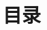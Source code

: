 \documentclass[11pt]{beamer}
\begin{document}
\begin{frame}[plain]\transboxout
  \titlepage
\end{frame}

\section*{目录}
\begin{frame}\ft{\secname}
    \tableofcontents
\end{frame}


 
\end{document}
